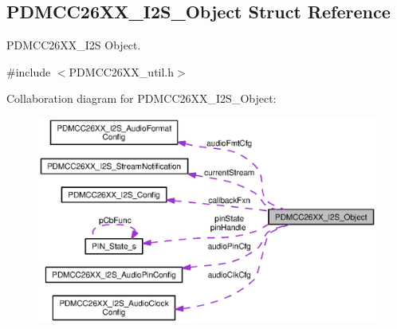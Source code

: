 \subsection{P\+D\+M\+C\+C26\+X\+X\+\_\+\+I2\+S\+\_\+\+Object Struct Reference}
\label{struct_p_d_m_c_c26_x_x___i2_s___object}


P\+D\+M\+C\+C26\+X\+X\+\_\+\+I2\+S Object.  




{\ttfamily \#include $<$P\+D\+M\+C\+C26\+X\+X\+\_\+util.\+h$>$}



Collaboration diagram for P\+D\+M\+C\+C26\+X\+X\+\_\+\+I2\+S\+\_\+\+Object\+:
\nopagebreak
\begin{figure}[H]
\begin{center}
\leavevmode
\includegraphics[width=350pt]{struct_p_d_m_c_c26_x_x___i2_s___object__coll__graph}
\end{center}
\end{figure}

